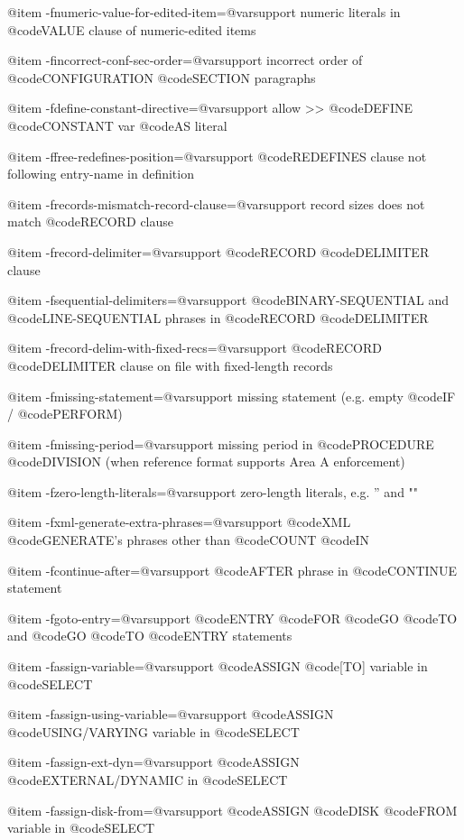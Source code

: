 @item -fnumeric-value-for-edited-item=@var{support}
numeric literals in @code{VALUE} clause of numeric-edited items

@item -fincorrect-conf-sec-order=@var{support}
incorrect order of @code{CONFIGURATION} @code{SECTION} paragraphs

@item -fdefine-constant-directive=@var{support}
allow >> @code{DEFINE} @code{CONSTANT} var @code{AS} literal

@item -ffree-redefines-position=@var{support}
@code{REDEFINES} clause not following entry-name in definition

@item -frecords-mismatch-record-clause=@var{support}
record sizes does not match @code{RECORD} clause

@item -frecord-delimiter=@var{support}
@code{RECORD} @code{DELIMITER} clause

@item -fsequential-delimiters=@var{support}
@code{BINARY-SEQUENTIAL} and @code{LINE-SEQUENTIAL} phrases in @code{RECORD} @code{DELIMITER}

@item -frecord-delim-with-fixed-recs=@var{support}
@code{RECORD} @code{DELIMITER} clause on file with fixed-length records

@item -fmissing-statement=@var{support}
missing statement (e.g. empty @code{IF} / @code{PERFORM})

@item -fmissing-period=@var{support}
missing period in @code{PROCEDURE} @code{DIVISION} (when reference format supports Area A enforcement)

@item -fzero-length-literals=@var{support}
zero-length literals, e.g. '' and ""

@item -fxml-generate-extra-phrases=@var{support}
@code{XML} @code{GENERATE'}s phrases other than @code{COUNT} @code{IN}

@item -fcontinue-after=@var{support}
@code{AFTER} phrase in @code{CONTINUE} statement

@item -fgoto-entry=@var{support}
@code{ENTRY} @code{FOR} @code{GO} @code{TO} and @code{GO} @code{TO} @code{ENTRY} statements

@item -fassign-variable=@var{support}
@code{ASSIGN} @code{[TO]} variable in @code{SELECT}

@item -fassign-using-variable=@var{support}
@code{ASSIGN} @code{USING/VARYING} variable in @code{SELECT}

@item -fassign-ext-dyn=@var{support}
@code{ASSIGN} @code{EXTERNAL/DYNAMIC} in @code{SELECT}

@item -fassign-disk-from=@var{support}
@code{ASSIGN} @code{DISK} @code{FROM} variable in @code{SELECT}

